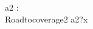 \begin{circus}
\circchannel a2 : \nat \\
\circprocess Roadtocoverage2 \circdef \circbegin
	\circspot a2?x \then \Skip \\%
	\circend
\end{circus}

